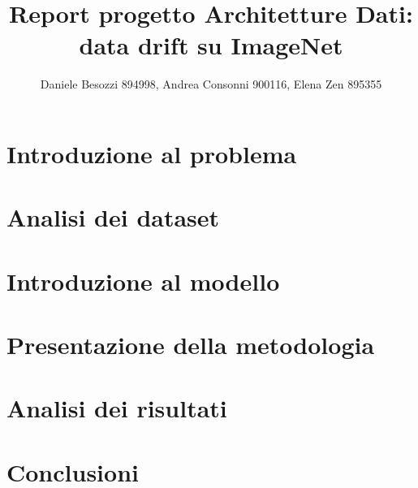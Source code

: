 \documentclass{report}
\title{Report progetto Architetture Dati: data drift su ImageNet}
\author{Daniele Besozzi 894998, Andrea Consonni 900116, Elena Zen 895355}
\date{}
\theoremstyle{definition}
\begin{document}
\maketitle
\tableofcontents
\chapter{Introduzione al problema}

\chapter{Analisi dei dataset}

\chapter{Introduzione al modello}


\chapter{Presentazione della metodologia}

\chapter{Analisi dei risultati}

\chapter{Conclusioni}

\printbibliography
\end{document}
